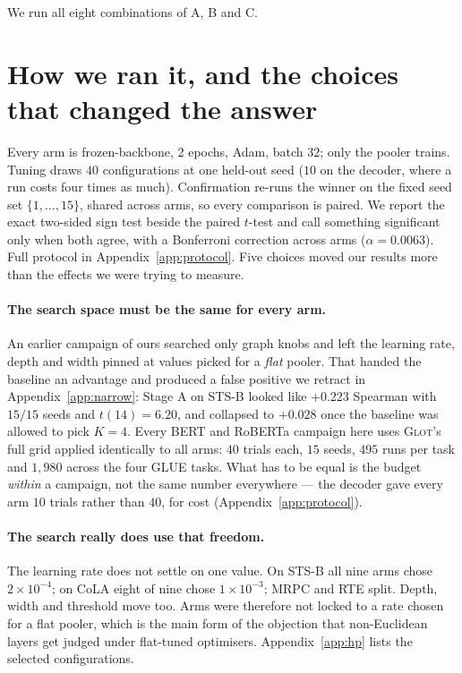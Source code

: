 \documentclass{article}
\begin{document}
We run all eight combinations of A, B and C.

\section{How we ran it, and the choices that changed the answer}
\label{sec:choices}

Every arm is frozen-backbone, 2 epochs, Adam, batch $32$; only the pooler
trains. Tuning draws $40$ configurations at one held-out seed ($10$ on the
decoder, where a run costs four times as much). Confirmation
re-runs the winner on the fixed seed set $\{1,\dots,15\}$, shared across arms,
so every comparison is paired. We report the exact two-sided sign test beside
the paired $t$-test and call something significant only when both agree, with a
Bonferroni correction across arms ($\alpha = 0.0063$). Full protocol in
Appendix~\ref{app:protocol}. Five choices moved our results more than the
effects we were trying to measure.

\paragraph{The search space must be the same for every arm.} An earlier
campaign of ours searched only graph knobs and left the learning rate, depth and
width pinned at values picked for a \emph{flat} pooler. That handed the baseline
an advantage and produced a false positive we retract in
Appendix~\ref{app:narrow}: Stage A on STS-B looked like $+0.223$ Spearman with
$15/15$ seeds and $t(14)=6.20$, and collapsed to $+0.028$ once the baseline was
allowed to pick $K=4$. Every BERT and RoBERTa campaign here uses \textsc{Glot}'s
full grid applied identically to all arms: $40$ trials each, $15$ seeds, $495$
runs per task and $1{,}980$ across the four GLUE tasks. What has to be equal is
the budget \emph{within} a campaign, not the same number everywhere --- the
decoder gave every arm $10$ trials rather than $40$, for cost
(Appendix~\ref{app:protocol}).

\paragraph{The search really does use that freedom.} The learning rate does not
settle on one value. On STS-B all nine arms chose $2\times10^{-4}$; on CoLA
eight of nine chose $1\times10^{-3}$; MRPC and RTE split. Depth, width and
threshold move too. Arms were therefore not locked to a rate chosen for a flat
pooler, which is the main form of the objection that non-Euclidean layers get
judged under flat-tuned optimisers. Appendix~\ref{app:hp} lists the selected
configurations.
\end{document}
